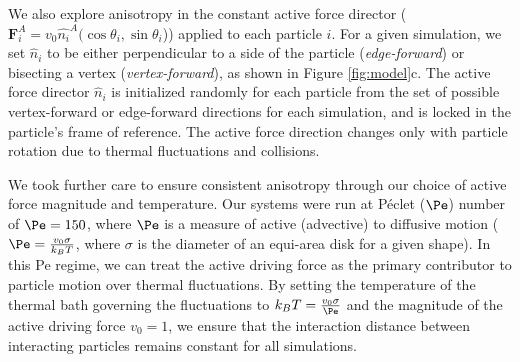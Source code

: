 We also explore anisotropy in the constant active force director ($\bm{F}^A_i=v_0\hat{n_i}^A(\cos{\theta_i}, \sin{\theta_i}$)) applied to each particle $i$.
For a given simulation, we set $\hat{n}_i$ to be either perpendicular to a side of the particle (\textit{edge-forward}) or bisecting a vertex (\textit{vertex-forward}), as shown in Figure \ref{fig:model}c.
The active force director $\hat{n}_i$ is initialized randomly for each particle from the set of possible vertex-forward or edge-forward directions for each simulation, and is locked in the particle's frame of reference.
The active force direction changes only with particle rotation due to thermal fluctuations and collisions.

We took further care to ensure consistent anisotropy through our choice of active force magnitude and temperature.
Our systems were run at P\'{e}clet ($\Pe$) number of $\Pe=150$, where $\Pe$ is a measure of active (advective) to diffusive motion ($\Pe=\frac{v_0\sigma}{k_BT}$, where $\sigma$ is the diameter of an equi-area disk for a given shape).
In this Pe regime, we can treat the active driving force as the primary contributor to particle motion over thermal fluctuations.
By setting the temperature of the thermal bath governing the fluctuations to $k_BT = \frac{v_0\sigma}{\Pe}$ and the magnitude of the active driving force $v_0=1$, we ensure that the interaction distance between interacting particles remains constant for all simulations.

